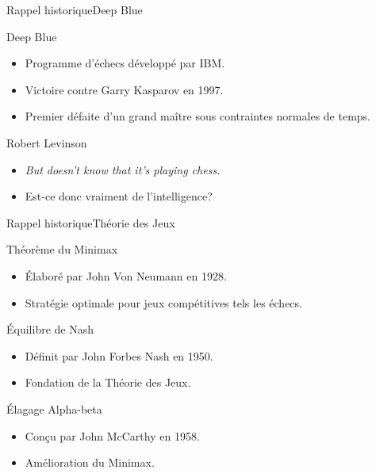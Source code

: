 
\begin{frame}{Rappel historique}{Deep Blue}

\begin{block}{Deep Blue} 
\begin{itemize}
\item Programme d'échecs développé par IBM.
\item Victoire contre Garry Kasparov en 1997.
\item Premier défaite d'un grand maître sous contraintes normales de temps.
\end{itemize}
\end{block}

\pause

\begin{block}{Robert Levinson} 
\begin{itemize}
\item \textit{\og But doesn't know that it's playing chess.\fg{}}
\item Est-ce donc vraiment de l'intelligence?
\end{itemize}
\end{block}

\end{frame}




\begin{frame}{Rappel historique}{Théorie des Jeux}
 
\begin{block}{Théorème du Minimax} 
\begin{itemize}
\item Élaboré par John Von Neumann en 1928.
\item Stratégie optimale pour jeux compétitives tels les échecs.
\end{itemize}
\end{block}

\pause

\begin{block}{Équilibre de Nash} 
\begin{itemize}
\item Définit par John Forbes Nash en 1950.
\item Fondation de la Théorie des Jeux.
\end{itemize}
\end{block}

\pause

\begin{block}{Élagage Alpha-beta} 
\begin{itemize}
\item Conçu par John McCarthy en 1958.
\item Amélioration du Minimax.
\end{itemize}
\end{block}

\end{frame}


